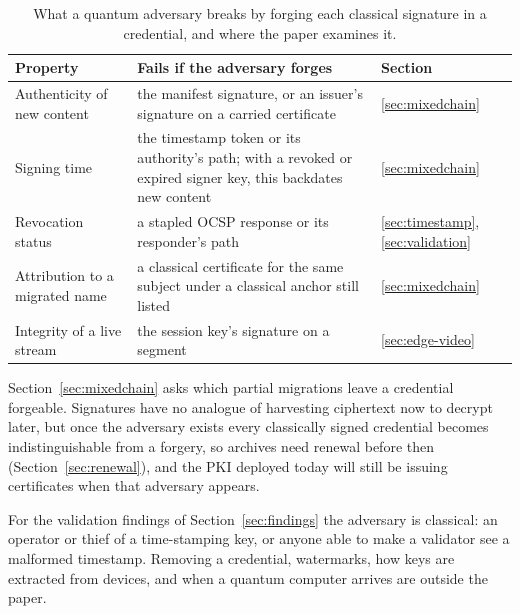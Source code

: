\begin{table}[t]
\caption{What a quantum adversary breaks by forging each classical signature
in a credential, and where the paper examines it.}
\label{tab:properties}
\footnotesize
\begin{tabular}{>{\raggedright\arraybackslash}p{3.4cm}>{\raggedright\arraybackslash}p{6.6cm}l}
\toprule
Property & Fails if the adversary forges & Section\\
\midrule
Authenticity of new content & the manifest signature, or an issuer's signature on a carried certificate & \ref{sec:mixedchain}\\
Signing time & the timestamp token or its authority's path; with a revoked or expired signer key, this backdates new content & \ref{sec:mixedchain}\\
Revocation status & a stapled OCSP response or its responder's path & \ref{sec:timestamp}, \ref{sec:validation}\\
Attribution to a migrated name & a classical certificate for the same subject under a classical anchor still listed & \ref{sec:mixedchain}\\
Integrity of a live stream & the session key's signature on a segment & \ref{sec:edge-video}\\
\bottomrule
\end{tabular}
\end{table}

Section~\ref{sec:mixedchain} asks which partial migrations leave a
credential forgeable. Signatures have no analogue of harvesting
ciphertext now to decrypt later, but once the adversary exists every
classically signed credential becomes indistinguishable from a forgery, so
archives need renewal before then (Section~\ref{sec:renewal}), and the PKI
deployed today will still be issuing certificates when that adversary
appears.

For the validation findings of Section~\ref{sec:findings} the adversary is
classical: an operator or thief of a time-stamping key, or anyone able to make
a validator see a malformed timestamp. Removing a credential, watermarks,
how keys are extracted from devices, and when a quantum computer arrives are outside
the paper.

